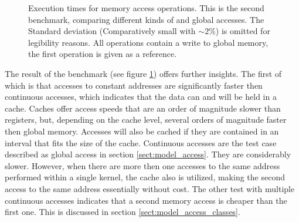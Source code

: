 \begin{figure}[hbp]
	\begin{center}
		\caption{Execution times for memory access operations. This is the second benchmark, comparing different kinds of and global accesses. The Standard deviation (Comparatively small with $\sim 2 \%$) is omitted for legibility reasons. All operations contain a write to global memory, the first operation is given as a reference.}
		\label{fig:model_access_single_classes}
	\end{center}
\end{figure}

The result of the benchmark (see figure \ref{fig:model_access_single_classes}) offers further insights. The first of which is that accesses to constant addresses are significantly faster then continuous accesses, which indicates that the data can and will be held in a cache. Caches offer access speeds that are an order of magnitude slower than registers, but, depending on the cache level, several orders of magnitude faster then global memory. Accesses will also be cached if they are contained in an interval that fits the size of the cache. Continuous accesses are the test case described as global access in section \ref{sect:model_access}. They are considerably slower. However, when there are more then one accesses to the same address performed within a single kernel, the cache also is utilized, making the second access to the same address essentially without cost. The other test with multiple continuous accesses indicates that a second memory access is cheaper than the first one. This is discussed in section \ref{sect:model_access_classes}. \\

